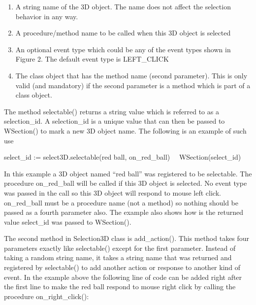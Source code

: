 \documentclass[letterpaper]{article}
\newcommand\liststyleLix{%
\renewcommand\theenumi{\arabic{enumi}}
\renewcommand\theenumii{\arabic{enumii}}
\renewcommand\theenumiii{\arabic{enumiii}}
\renewcommand\theenumiv{\arabic{enumiv}}
\renewcommand\labelenumi{\theenumi.}
\renewcommand\labelenumii{\theenumii.}
\renewcommand\labelenumiii{\theenumiii.}
\renewcommand\labelenumiv{\theenumiv.}
}
\begin{document}
{\bigskip

\liststyleLix
\begin{enumerate}
\item {
A string name of the 3D object. The name does not affect the selection behavior in any way. }
\item {
A procedure/method name to be called when this 3D object is selected}
\item {
An optional event type which could be any of the event types shown in Figure 2. The default event type is
\textsf{LEFT\_CLICK}}
\item {
The class object that has the method name (second parameter). This is only valid (and mandatory) if the second
parameter is a method which is part of a class object.}
\end{enumerate}

\bigskip

The method \textsf{selectable()} returns a string value which is
referred to as a selection\_id. A selection\_id is a unique value
that can then be passed to \textsf{WSection()} to mark a new
3D object name. The following is an example of such use

\bigskip

{\sffamily
select\_id := select3D.selectable({\textquotedbl}red ball{\textquotedbl}, on\_red\_ball)~~ \newline
WSection(select\_id)}

\bigskip

In this example a 3D object named \textsf{{}``red ball''} was
registered to be selectable. The procedure \textsf{on\_red\_ball} will
be called if this 3D object is selected. No event type was passed in
the call so this 3D object will respond to mouse left
click. \textsf{on\_red\_ball} must be a procedure name (not a method)
so nothing should be passed as a fourth parameter also. The example
also shows how is the returned value \textsf{select\_id} was passed to
\textsf{WSection()}.

\bigskip

The second method in Selection3D class is \textsf{add\_action()}. This
method takes four parameters exactly like \textsf{selectable()} except
for the first parameter. Instead of taking a random string name, it
takes a string name that was returned and registered by
\textsf{selectable()} to add another action or response to another
kind of event.  In the example above the following line of code can be
added right after the first line to make the red ball respond to mouse
right click by calling the procedure \textsf{on\_right\_click():}


}
\end{document}
